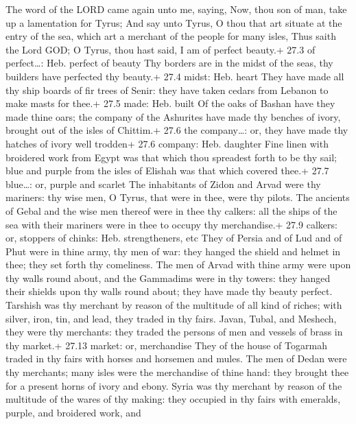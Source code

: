 The word of the LORD came again unto me, saying,
 Now, thou son of man, take up a lamentation for Tyrus;
 And say unto Tyrus, O thou that art situate at the entry of
the sea, which art a merchant of the people for many isles, Thus saith
the Lord GOD; O Tyrus, thou hast said, I am of perfect beauty.+ 27.3 of
perfect\ldots: Heb. perfect of beauty  Thy borders are in
the midst of the seas, thy builders have perfected thy beauty.+ 27.4
midst: Heb. heart  They have made all thy ship boards of fir
trees of Senir: they have taken cedars from Lebanon to make masts for
thee.+ 27.5 made: Heb. built  Of the oaks of Bashan have
they made thine oars; the company of the Ashurites have made thy benches
of ivory, brought out of the isles of Chittim.+ 27.6 the company\ldots:
or, they have made thy hatches of ivory well trodden+ 27.6 company: Heb.
daughter  Fine linen with broidered work from Egypt was that
which thou spreadest forth to be thy sail; blue and purple from the
isles of Elishah was that which covered thee.+ 27.7 blue\ldots: or,
purple and scarlet  The inhabitants of Zidon and Arvad were
thy mariners: thy wise men, O Tyrus, that were in thee, were thy pilots.
 The ancients of Gebal and the wise men thereof were in thee
thy calkers: all the ships of the sea with their mariners were in thee
to occupy thy merchandise.+ 27.9 calkers: or, stoppers of chinks: Heb.
strengtheners, etc  They of Persia and of Lud and of Phut
were in thine army, thy men of war: they hanged the shield and helmet in
thee; they set forth thy comeliness.  The men of Arvad with
thine army were upon thy walls round about, and the Gammadims were in
thy towers: they hanged their shields upon thy walls round about; they
have made thy beauty perfect.  Tarshish was thy merchant by
reason of the multitude of all kind of riches; with silver, iron, tin,
and lead, they traded in thy fairs.  Javan, Tubal, and
Meshech, they were thy merchants: they traded the persons of men and
vessels of brass in thy market.+ 27.13 market: or, merchandise
 They of the house of Togarmah traded in thy fairs with
horses and horsemen and mules.  The men of Dedan were thy
merchants; many isles were the merchandise of thine hand: they brought
thee for a present horns of ivory and ebony.  Syria was thy
merchant by reason of the multitude of the wares of thy making: they
occupied in thy fairs with emeralds, purple, and broidered work, and
